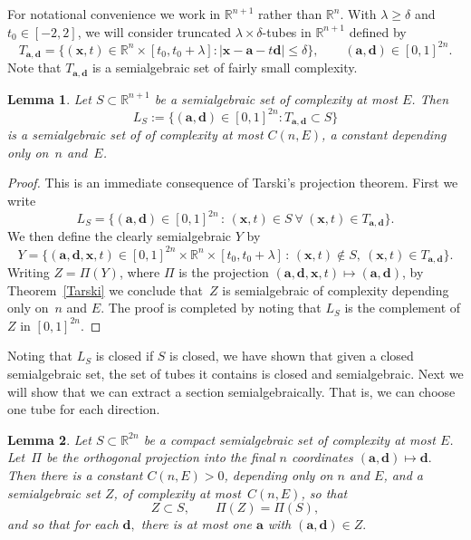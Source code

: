 \documentclass[letterpaper, reqno, 11pt]{amsart}
\newtheorem{lem}{Lemma}[section]
\theoremstyle{remark}
\numberwithin{equation}{section}
\begin{document}
For notational convenience we work in  $\mathbb{R}^{n+1}$ rather than $\mathbb{R}^{n}$. With $\lambda\ge\delta$ and $t_0\in[-2,2]$, we will consider truncated $\lambda\times \delta$-tubes in $\mathbb{R}^{n+1}$ defined by
$$T_{\mathbf{a},\mathbf{d}} = \big\{ (\mathbf{x}, t)\in \mathbb{R}^{n}\times[t_0,t_0+\lambda]:  |\mathbf{x} - \mathbf{a} -t \mathbf{d}| \leq \delta\big\},\qquad (\mathbf{a},\mathbf{d})\in[0,1]^{2n}.$$
Note that $T_{\mathbf{a},\mathbf{d}}$ is a semialgebraic set of fairly small complexity.

\begin{lem} \label{We'reinbusiness} Let $S \subset \mathbb{R}^{n+1}$ be a semialgebraic set of complexity at most $E$. Then
$$L_S := \big\{ (\mathbf{a},\mathbf{d})\in[0,1]^{2n}: T_{\mathbf{a},\mathbf{d}} \subset S \big\}$$
is a semialgebraic set of of complexity at most $C(n,E)$, a constant depending only on~$n$ and~$E$.
\end{lem}



\begin{proof} This is an immediate consequence of Tarski's projection theorem. First  we  write $$L_S= \big\{ (\mathbf{a},\mathbf{d})\in[0,1]^{2n}\,:\,  (\mathbf{x},t)\in S\ \forall\ (\mathbf{x},t)\in T_{\mathbf{a},\mathbf{d}}\big\}.$$
We then define the clearly semialgebraic $Y$ by
$$Y =\big\{(\mathbf{a},\mathbf{d},\mathbf{x},t)\in [0,1]^{2n}\times\mathbb{R}^n\times[t_0,t_0+\lambda]\,:\, (\mathbf{x},t)  \notin S, \ (\mathbf{x},t)\in T_{\mathbf{a},\mathbf{d}} \big\}.$$
Writing 
$Z=\Pi (Y)$, where $\Pi$ is the projection $(\mathbf{a},\mathbf{d}, \mathbf{x}, t)\mapsto(\mathbf{a}, \mathbf{d})$, by Theorem~\ref{Tarski} we conclude that~$Z$ is semialgebraic of complexity depending only on~$n$ and $E$. The proof is completed by noting that $L_S$ is the complement of $Z$ in $[0,1]^{2n}$.
\end{proof}


Noting that $L_S$ is closed if $S$ is closed, we have shown that given a closed semialgebraic set, the set of tubes it contains is closed and semialgebraic. Next we will show that we can extract a section semialgebraically. That is, we can choose one tube for each direction.

\begin{lem} \label{Extractingsection} Let $S \subset \mathbb{R}^{2n}$ be a compact semialgebraic set of complexity at most $E$. Let~$\Pi$ be the orthogonal projection into the final $n$ coordinates 
$(\mathbf{a},\mathbf{d}) \mapsto \mathbf{d}.$
Then there is a constant $C(n,E)>0$, depending only on $n$ and $E$, and a semialgebraic set $Z$, of complexity at most~$C(n,E)$, so that
$$Z \subset S,\quad\quad
\Pi(Z)= \Pi(S),$$
and so that for each $\mathbf{d},$ there is at most one $\mathbf{a}$ with
$(\mathbf{a},\mathbf{d}) \in Z.$
\end{lem}
\end{document}
